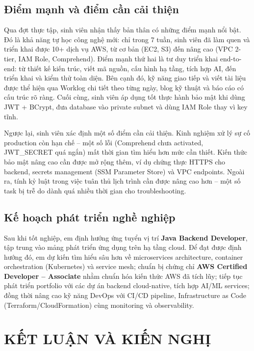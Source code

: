 \documentclass[13pt]{extarticle}
\begin{document}
\subsection{Điểm mạnh và điểm cần cải thiện}

Qua đợt thực tập, sinh viên nhận thấy bản thân có những điểm mạnh nổi bật.
Đó là khả năng tự học công nghệ mới: chỉ trong 7 tuần, sinh viên đã làm quen
và triển khai được 10+ dịch vụ AWS, từ cơ bản (EC2, S3) đến nâng cao (VPC
2-tier, IAM Role, Comprehend). Điểm mạnh thứ hai là tư duy triển khai
end-to-end: từ thiết kế kiến trúc, viết mã nguồn, cấu hình hạ tầng, tích hợp
AI, đến triển khai và kiểm thử toàn diện. Bên cạnh đó, kỹ năng giao tiếp và
viết tài liệu được thể hiện qua Worklog chi tiết theo từng ngày, blog kỹ
thuật và báo cáo có cấu trúc rõ ràng. Cuối cùng, sinh viên áp dụng tốt thực
hành bảo mật khi dùng JWT + BCrypt, đưa database vào private subnet và dùng
IAM Role thay vì key tĩnh.

Ngược lại, sinh viên xác định một số điểm cần cải thiện. Kinh nghiệm xử lý
sự cố production còn hạn chế -- một số lỗi (Comprehend chưa activated,
JWT\_SECRET quá ngắn) mất thời gian tìm hiểu hơn mức cần thiết. Kiến thức
bảo mật nâng cao cần được mở rộng thêm, ví dụ chứng thực HTTPS cho backend,
secrets management (SSM Parameter Store) và VPC endpoints. Ngoài ra, tính kỷ
luật trong việc tuân thủ lịch trình cần được nâng cao hơn -- một số task bị
trễ do dành quá nhiều thời gian cho troubleshooting.

\subsection{Kế hoạch phát triển nghề nghiệp}

Sau khi tốt nghiệp, em định hướng ứng tuyển vị trí \textbf{Java Backend
Developer}, tập trung vào mảng phát triển ứng dụng trên hạ tầng cloud. Để
đạt được định hướng đó, em dự kiến tìm hiểu sâu hơn về microservices
architecture, container orchestration (Kubernetes) và service mesh; chuẩn bị
chứng chỉ \textbf{AWS Certified Developer -- Associate} nhằm chuẩn hóa kiến
thức AWS đã tích lũy; tiếp tục phát triển portfolio với các dự án backend
cloud-native, tích hợp AI/ML services; đồng thời nâng cao kỹ năng DevOps với
CI/CD pipeline, Infrastructure as Code (Terraform/CloudFormation) cùng
monitoring và observability.

\newpage

\section{KẾT LUẬN VÀ KIẾN NGHỊ}
\end{document}
